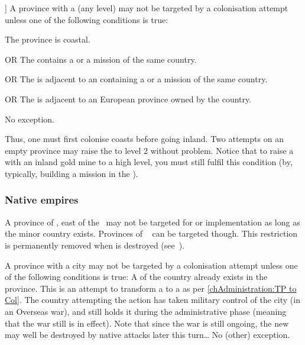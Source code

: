 \aparag[Inland advance [TBD]] A province with a \COL (any level) may not be
targeted by a colonisation attempt unless one of the following conditions is
true:
\begin{modlist}
\item The province is coastal.
\item[OR] The \Area contains a \COL\faceplus or a mission of the same country.
\item[OR] The \Area is adjacent to an \Area containing a \COL\faceplus or a
  mission of the same country.
\item[OR] The \Area is adjacent to an European province owned by the country.
\end{modlist}
\bparag No exception.

\begin{designnote}
  Thus, one must first colonise coasts before going inland. Two attempts on an
  empty province may raise the \COL to level 2 without problem. Notice that to
  raise a \COL with an inland gold mine to a high level, you must still fulfil
  this condition (by, typically, building a mission in the \Area).
\end{designnote}


\subsubsection{Native empires}\label{chAdministration:Native empires}
\aparag[Siberia] A province of \continentSiberia, east of the \Area\
\granderegionSiberie may not be targeted for \TP or \COL implementation as
long as the minor country \paysSiberie exists. Provinces of \Area\
 can be targeted though.
\bparag This restriction is permanently removed when \pays{Siberie} is
destroyed (see~\ruleref{chSpecific:Siberia}).

\aparag[Cities] A province with a city may not be targeted by a colonisation
attempt unless one of the following conditions is true:
\bparag A \COL of the country already exists in the province.
\bparag This is an attempt to transform a \TP to a \COL as per
\ref{chAdministration:TP to Col}.
\bparag The country attempting the action has taken military control of the
city (in an Overseas war), and still holds it during the administrative phase
(meaning that the war still is in effect). Note that since the war is still
ongoing, the new \COL may well be destroyed by native attacks later this
turn\ldots
\bparag No (other) exception.





